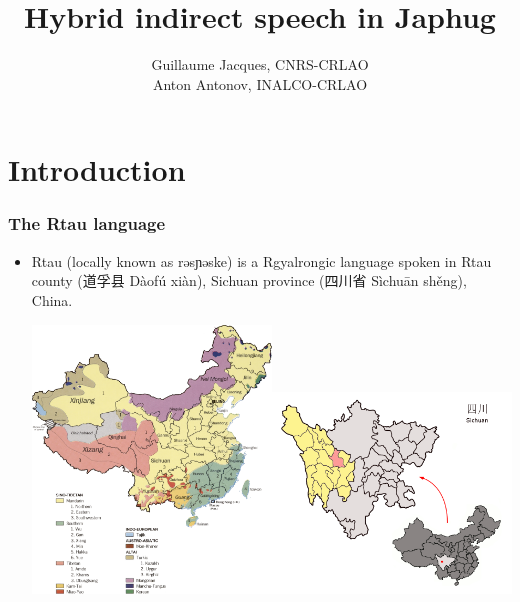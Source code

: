\documentclass[xcolor=table]{beamer}
\newcommand{\ipa}[1]{{\phon #1}} %
\newcommand{\zh}[1]{{\cn #1}}
\begin{document}
 
\begin{frame} 

\title{Hybrid indirect speech in Japhug} 

 \author{Guillaume Jacques, CNRS-CRLAO \\ Anton Antonov, INALCO-CRLAO }
\maketitle
 \end{frame} 


\section{Introduction}
\begin{frame}
\frametitle{The Rtau language}


\begin{itemize}
 \item  Rtau (locally known as \ipa{rəsɲəske}) is a Rgyalrongic language spoken in Rtau county (\zh{道孚县} Dàofú xiàn), Sichuan province (\zh{四川省} Sìchuān shěng), China.

\includegraphics[width=0.5\textwidth]{chinalingmap.jpg}\includegraphics[width=0.5\textwidth]{dawu.png}

\end{itemize}
\end{frame} 
\end{document}
